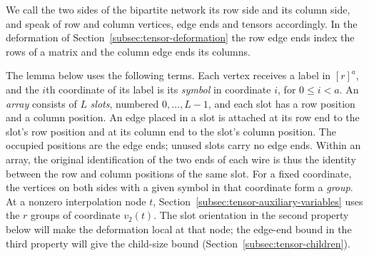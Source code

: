 We call the two sides of the bipartite network its row side and its
column side, and speak of row and column vertices, edge ends and tensors
accordingly. In the deformation of Section~\ref{subsec:tensor-deformation}
the row edge ends index the rows of a matrix and the column edge ends its
columns.

The lemma below uses the following terms. Each vertex receives a label
in $[r]^a$, and the $i$th coordinate of its label is its \emph{symbol}
in coordinate $i$, for $0\le i<a$. An \emph{array} consists of $L$
\emph{slots}, numbered $0,\ldots,L-1$, and each slot has a row position
and a column position. An edge placed in a slot is attached at its row
end to the slot's row position and at its column end to the slot's
column position. The occupied positions are the edge ends;
unused slots carry no edge ends. Within an array, the original
identification of the two ends of each wire is thus the identity
between the row and column positions of the same slot. For a fixed
coordinate, the vertices on both sides with a given symbol in that
coordinate form a \emph{group}. At a nonzero interpolation node $t$,
Section~\ref{subsec:tensor-auxiliary-variables} uses the $r$ groups of coordinate
$v_2(t)$. The slot orientation in the second property below will make
the deformation local at that node; the edge-end bound in the third
property will give the child-size bound
(Section~\ref{subsec:tensor-children}).

